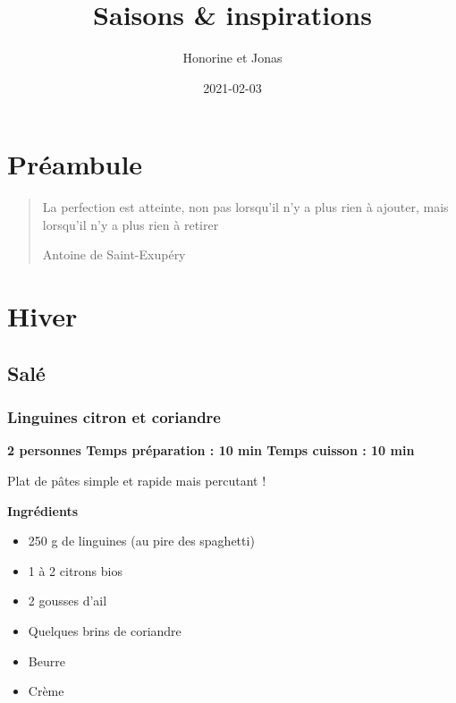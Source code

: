 \documentclass[]{book}
\title{Saisons \& inspirations}
\author{Honorine et Jonas}
\date{2021-02-03}
\providecommand{\tightlist}{%
  \setlength{\itemsep}{0pt}\setlength{\parskip}{0pt}}
\begin{document}
\maketitle

{
\setcounter{tocdepth}{1}
\tableofcontents
}
\chapter*{Préambule}\label{Pruxe9ambule}

\begin{quote}
La perfection est atteinte, non pas lorsqu'il n'y a plus rien à ajouter,
mais lorsqu'il n'y a plus rien à retirer

Antoine de Saint-Exupéry
\end{quote}

\chapter*{Hiver}\label{hiver}

\section*{Salé}\label{saluxe9}

\subsection*{\texorpdfstring{{Linguines citron et
coriandre}}{Linguines citron et coriandre}}\label{linguines-citron-et-coriandre}

\begin{salebox}
\textbf{2 personnes \textbar{} Temps préparation : 10 min \textbar{}
Temps cuisson : 10 min}

Plat de pâtes simple et rapide mais percutant !
\end{salebox}

 \textbf{Ingrédients}

\begin{itemize}
\tightlist
\item
  250 g de linguines (au pire des spaghetti)
\item
  1 à 2 citrons bios
\item
  2 gousses d'ail
\item
  Quelques brins de coriandre
\item
  Beurre
\item
  Crème
\end{itemize}
\end{document}
